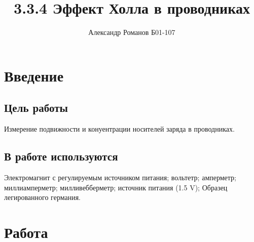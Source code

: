 \documentclass{article}
\author{Александр Романов Б01-107}
\date{}
\title{3.3.4 Эффект Холла в проводниках}
\begin{document}
\maketitle
\section{Введение}
\subsection{Цель работы}
Измерение подвижности и конуентрации носителей заряда в проводниках.
\subsection{В работе используются} 
Электромагнит с регулируемым источником питания; вольтетр; амперметр; миллиамперметр;
милливебберметр; источник питания (1.5 V); Образец легированного германия.

\section {Работа}
\end{document}
